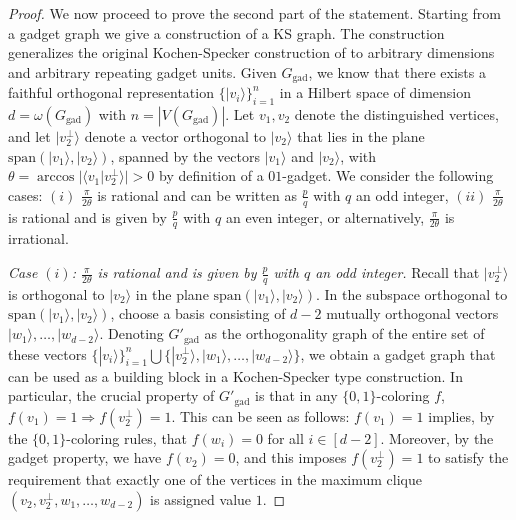 \documentclass[twocolumn, a4paper, superscriptaddress,nofootinbib, accepted=2020-08-07, hyperref]{quantumarticle}
\begin{document}
\begin{proof}
We now proceed to prove the second part of the statement. Starting from a gadget graph we give a construction of a KS graph. The construction generalizes the original Kochen-Specker construction of \cite{KS} to arbitrary dimensions and arbitrary repeating gadget units. Given $G_{\text{gad}}$, we know that there exists a faithful orthogonal representation $\{| v_i \rangle\}_{i=1}^{n}$ in a Hilbert space of dimension $d = \omega(G_{\text{gad}})$ with $n = |V(G_{\text{gad}})|$. Let $v_1, v_2$ denote the distinguished vertices, and let $|v_2^{\perp} \rangle$ denote a vector orthogonal to $|v_2 \rangle$ that lies in the plane $\text{span}(|v_1 \rangle, |v_2 \rangle)$, spanned by the vectors $|v_1 \rangle$ and $|v_2 \rangle$, with $\theta = \arccos{|\langle v_1| v_2^{\perp} \rangle|}>0$ by definition of a $01$-gadget. We consider the following cases: $(i)$ $\frac{\pi}{2 \theta}$ is rational and can be written as $\frac{p}{q}$ with $q$ an odd integer, $(ii)$ $\frac{\pi}{2 \theta}$ is rational and is given by $\frac{p}{q}$ with $q$ an even integer, or alternatively, $\frac{\pi}{2 \theta}$ is irrational.  
 
\emph{Case $(i)$: $\frac{\pi}{2 \theta}$ is rational and is given by $\frac{p}{q}$ with $q$ an odd integer.}
	 Recall that $|v_2^{\perp} \rangle$ is orthogonal to $|v_2 \rangle$ in the plane $\text{span}(|v_1 \rangle, |v_2 \rangle)$. In the subspace orthogonal to $\text{span}(|v_1 \rangle, |v_2 \rangle)$, choose a basis consisting of $d-2$ mutually orthogonal vectors $|w_1 \rangle, \dots, |w_{d-2} \rangle$. Denoting $G'_{\text{gad}}$ as the orthogonality graph of the entire set of these vectors $\{| v_i \rangle\}_{i=1}^{n} \bigcup \{|v_2^{\perp} \rangle, |w_1 \rangle, \dots, |w_{d-2} \rangle\}$, we obtain a gadget graph that can be used as a building block in a Kochen-Specker type construction. In particular, the crucial property of $G'_{\text{gad}}$ is that in any $\{0,1\}$-coloring $f$, $f(v_1) = 1 \Rightarrow f(v_2^{\perp}) = 1$. This can be seen as follows: $f(v_1) = 1$ implies, by the $\{0,1\}$-coloring rules, that $f(w_i) = 0$ for all $i \in [d-2]$. Moreover, by the gadget property, we have $f(v_2) = 0$, and this imposes $f(v_2^{\perp}) = 1$ to satisfy the requirement that exactly one of the vertices in the maximum clique $(v_2,v_2^{\perp},w_1,\dots, w_{d-2})$ is assigned value $1$. 
	

\end{proof}
\end{document}

